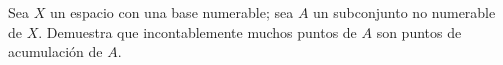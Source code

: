 
\item Sea $X$ un espacio con una base numerable; sea $A$ un subconjunto no numerable de $X$. Demuestra que incontablemente muchos puntos de $A$ son puntos de acumulación de $A$.